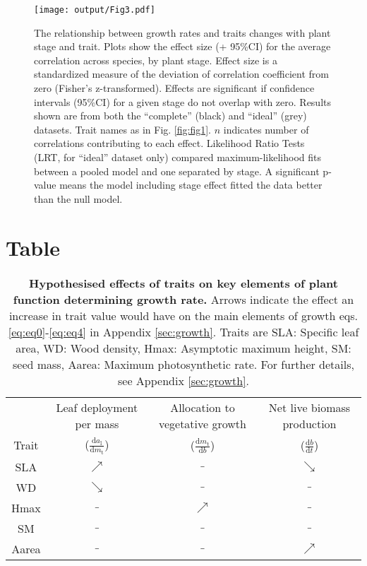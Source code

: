 \documentclass[a4paper,11pt]{article}
\begin{document}
\begin{figure}[h!]
\centering
\texttt{[image: output/Fig3.pdf]}
\caption{The relationship between growth rates and traits changes with plant stage and trait. Plots show the effect size (+ 95\%CI) for the average correlation across species, by plant stage. Effect size is a standardized measure of the deviation of correlation coefficient from zero (Fisher's z-transformed). Effects are significant if confidence intervals (95\%CI) for a given stage do not overlap with zero. Results shown are from both the ``complete'' (black)  and ``ideal'' (grey) datasets. Trait names as in Fig. \ref{fig:fig1}. $n$ indicates number of correlations contributing to each effect. Likelihood Ratio Tests (LRT, for ``ideal'' dataset only) compared maximum-likelihood fits between a pooled model and one separated by stage. A significant p-value means the model including stage effect fitted the data better than the null model.
}
\label{fig:fig3}
\end{figure}

\clearpage
\section*{Table}
\setcounter{table}{0}
\begin{table}[h!]
\centering
\caption{\textbf{Hypothesised effects of traits on key elements of plant function determining growth rate.} Arrows indicate the effect an increase in trait value would have on the main elements of growth eqs. \ref{eq:eq0}-\ref{eq:eq4} in Appendix \ref{sec:growth}. Traits are SLA: Specific leaf area, WD: Wood density, Hmax: Asymptotic maximum height, SM: seed mass, Aarea: Maximum photosynthetic rate. For further details, see  Appendix \ref{sec:growth}.}
{\footnotesize
\vspace{1cm}
  \begin{tabular}{cccc}
   & Leaf deployment per mass & Allocation to vegetative growth & Net live biomass production \\
   Trait
    & ($\frac{\textrm{d}a_\textrm{l}}{\textrm{d}m_\textrm{t}}$)
    & ($\frac{\textrm{d}m_\textrm{t}}{\textrm{d}b}$)
    & ($\frac{\textrm{d}b}{\textrm{d}t}$) \\ \hline
  SLA &$\nearrow$ &$\_$ & $\searrow$  \\
  WD & $\searrow$ &$\_$  &$\_$ \\
  Hmax &$\_$ &$\nearrow$ &$\_$ \\
  SM &$\_$&$\_$&$\_$ \\
  Aarea &$\_$ &$\_$ & $\nearrow$ \\
\hline
  \end{tabular}
  }
\label{tab:trade-offs}
  \end{table}
\end{document}
